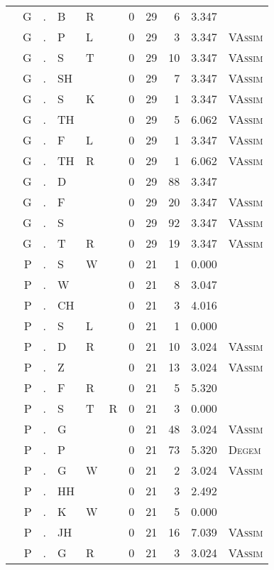 \begin{longtable}{r@{ } r@{ } c@{ } l@{ } l@{ } l@{ } r r r r l }
 & G & . & B & R &  & 0 & 29 & 6 & 3.347 &  \\
 & G & . & P & L &  & 0 & 29 & 3 & 3.347 & \textsc{VAssim} \\
 & G & . & S & T &  & 0 & 29 & 10 & 3.347 & \textsc{VAssim} \\
 & G & . & SH &  &  & 0 & 29 & 7 & 3.347 & \textsc{VAssim} \\
 & G & . & S & K &  & 0 & 29 & 1 & 3.347 & \textsc{VAssim} \\
 & G & . & TH &  &  & 0 & 29 & 5 & 6.062 & \textsc{VAssim} \\
 & G & . & F & L &  & 0 & 29 & 1 & 3.347 & \textsc{VAssim} \\
 & G & . & TH & R &  & 0 & 29 & 1 & 6.062 & \textsc{VAssim} \\
 & G & . & D &  &  & 0 & 29 & 88 & 3.347 &  \\
 & G & . & F &  &  & 0 & 29 & 20 & 3.347 & \textsc{VAssim} \\
 & G & . & S &  &  & 0 & 29 & 92 & 3.347 & \textsc{VAssim} \\
 & G & . & T & R &  & 0 & 29 & 19 & 3.347 & \textsc{VAssim} \\
 & P & . & S & W &  & 0 & 21 & 1 & 0.000 &  \\
 & P & . & W &  &  & 0 & 21 & 8 & 3.047 &  \\
 & P & . & CH &  &  & 0 & 21 & 3 & 4.016 &  \\
 & P & . & S & L &  & 0 & 21 & 1 & 0.000 &  \\
 & P & . & D & R &  & 0 & 21 & 10 & 3.024 & \textsc{VAssim} \\
 & P & . & Z &  &  & 0 & 21 & 13 & 3.024 & \textsc{VAssim} \\
 & P & . & F & R &  & 0 & 21 & 5 & 5.320 &  \\
 & P & . & S & T & R & 0 & 21 & 3 & 0.000 &  \\
 & P & . & G &  &  & 0 & 21 & 48 & 3.024 & \textsc{VAssim} \\
 & P & . & P &  &  & 0 & 21 & 73 & 5.320 & \textsc{Degem} \\
 & P & . & G & W &  & 0 & 21 & 2 & 3.024 & \textsc{VAssim} \\
 & P & . & HH &  &  & 0 & 21 & 3 & 2.492 &  \\
 & P & . & K & W &  & 0 & 21 & 5 & 0.000 &  \\
 & P & . & JH &  &  & 0 & 21 & 16 & 7.039 & \textsc{VAssim} \\
 & P & . & G & R &  & 0 & 21 & 3 & 3.024 & \textsc{VAssim} \\

\end{longtable}
